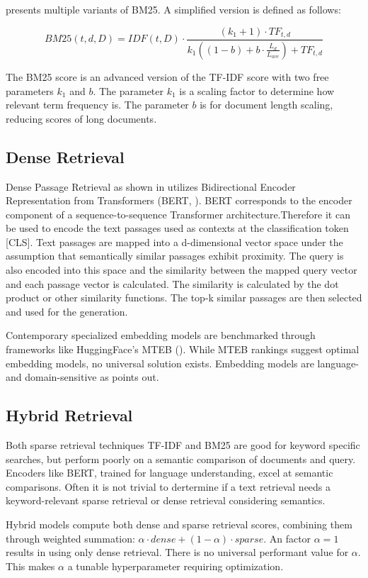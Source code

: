 \citet{Manning.2009} presents multiple variants of BM25. A simplified version is defined as follows:

$$BM25(t, d, D) = IDF(t, D) \cdot \frac{(k_1 + 1) \cdot TF_{t, d}}{k_1((1-b)+b \cdot \frac{L_d}{L_{ave}}) + TF_{t, d}}$$


The BM25 score is an advanced version of the TF-IDF score with two free parameters $k_1$ and $b$. The parameter $k_1$ is a scaling factor to determine how relevant term frequency is. The parameter $b$ is for document length scaling, reducing scores of long documents. 

\subsection{Dense Retrieval}
\label{sec:dense_retrieval}

Dense Passage Retrieval as shown in \citet{karpukhin2020densepassageretrievalopendomain} utilizes Bidirectional Encoder Representation from Transformers (BERT, \citet{devlin2019bertpretrainingdeepbidirectional}). BERT corresponds to the encoder component of a sequence-to-sequence Transformer architecture.Therefore it can be used to encode the text passages used as contexts at the classification token [CLS]. Text passages are mapped into a d-dimensional vector space under the assumption that semantically similar passages exhibit proximity. The query is also encoded into this space and the similarity between the mapped query vector and each passage vector is calculated. The similarity is calculated by the dot product or other similarity functions. The top-k similar passages are then selected and used for the generation.

Contemporary specialized embedding models are benchmarked through frameworks like HuggingFace's MTEB (\citet{muennighoff2022mteb}). While MTEB rankings suggest optimal embedding models, no universal solution exists. Embedding models are language- and domain-sensitive as \citet{Gao.18.12.2023} points out. 

\subsection{Hybrid Retrieval}
\label{sec:hybrid_retrieval}

Both sparse retrieval techniques TF-IDF and BM25 are good for keyword specific searches, but perform poorly on a semantic comparison of documents and query. Encoders like BERT, trained for language understanding, excel at semantic comparisons. Often it is not trivial to dertermine if a text retrieval needs a keyword-relevant sparse retrieval or dense retrieval considering semantics. 

Hybrid models compute both dense and sparse retrieval scores, combining them through weighted summation: 
$\alpha \cdot dense+(1 - \alpha )\cdot sparse$. An factor $\alpha=1$ results in using only dense retrieval. There is no universal performant value for $\alpha$. This makes $\alpha$ a tunable hyperparameter requiring optimization.
